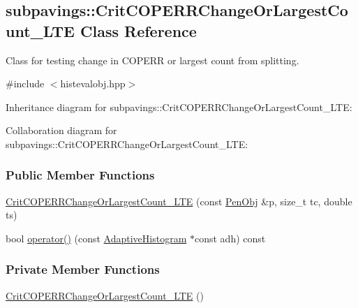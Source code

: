 \hypertarget{classsubpavings_1_1CritCOPERRChangeOrLargestCount__LTE}{\subsection{subpavings\-:\-:\-Crit\-C\-O\-P\-E\-R\-R\-Change\-Or\-Largest\-Count\-\_\-\-L\-T\-E \-Class \-Reference}
\label{classsubpavings_1_1CritCOPERRChangeOrLargestCount__LTE}
}


\-Class for testing change in \-C\-O\-P\-E\-R\-R or largest count from splitting.  




{\ttfamily \#include $<$histevalobj.\-hpp$>$}



\-Inheritance diagram for subpavings\-:\-:\-Crit\-C\-O\-P\-E\-R\-R\-Change\-Or\-Largest\-Count\-\_\-\-L\-T\-E\-:


\-Collaboration diagram for subpavings\-:\-:\-Crit\-C\-O\-P\-E\-R\-R\-Change\-Or\-Largest\-Count\-\_\-\-L\-T\-E\-:
\subsubsection*{\-Public \-Member \-Functions}
\begin{DoxyCompactItemize}
\item 
\hyperlink{classsubpavings_1_1CritCOPERRChangeOrLargestCount__LTE_a088a9774aa5d5d6ac9be185320bfbbce}{\-Crit\-C\-O\-P\-E\-R\-R\-Change\-Or\-Largest\-Count\-\_\-\-L\-T\-E} (const \hyperlink{classsubpavings_1_1PenObj}{\-Pen\-Obj} \&p, size\-\_\-t tc, double ts)
\item 
bool \hyperlink{classsubpavings_1_1CritCOPERRChangeOrLargestCount__LTE_ab43c4004ba53bd65bb94122dbdbc5c32}{operator()} (const \hyperlink{classsubpavings_1_1AdaptiveHistogram}{\-Adaptive\-Histogram} $\ast$const adh) const 
\end{DoxyCompactItemize}
\subsubsection*{\-Private \-Member \-Functions}
\begin{DoxyCompactItemize}
\item 
\hyperlink{classsubpavings_1_1CritCOPERRChangeOrLargestCount__LTE_a6833c0270691e63690c90911738d231e}{\-Crit\-C\-O\-P\-E\-R\-R\-Change\-Or\-Largest\-Count\-\_\-\-L\-T\-E} ()
\end{DoxyCompactItemize}
